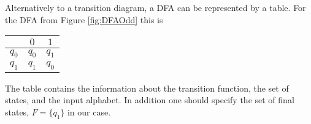 \begin{rem}
Alternatively to a transition diagram, a DFA can be represented by a table.
For the DFA from Figure \ref{fig:DFAOdd} this is
\begin{center}
\begin{tabular}{c|cc}
& $0$ & $1$\\
\hline
$q_0$ & $q_0$ & $q_1$\\
$q_1$ & $q_1$ & $q_0$
\end{tabular}
\end{center}
The table contains the information about the transition function, the set of states, and the input alphabet.
In addition one should specify the set of final states, $F = \{q_1\}$ in our case.
\end{rem}